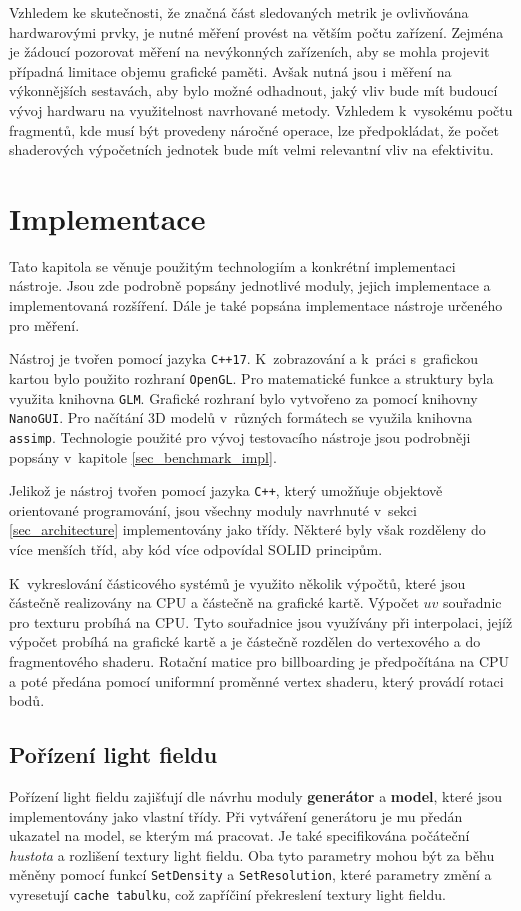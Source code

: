 Vzhledem ke skutečnosti, že značná část sledovaných metrik je ovlivňována hardwarovými prvky, je nutné měření provést na větším počtu zařízení. Zejména je žádoucí pozorovat měření na nevýkonných zařízeních, aby se mohla projevit případná limitace objemu grafické paměti. Avšak nutná jsou i měření na výkonnějších sestavách, aby bylo možné odhadnout, jaký vliv bude mít budoucí vývoj hardwaru na využitelnost navrhované metody. Vzhledem k~vysokému počtu fragmentů, kde musí být provedeny náročné operace, lze předpokládat, že počet shaderových výpočetních jednotek bude mít velmi relevantní vliv na efektivitu.

\chapter{Implementace}
Tato kapitola se věnuje použitým technologiím a konkrétní implementaci nástroje. Jsou zde podrobně popsány jednotlivé moduly, jejich implementace a implementovaná rozšíření. Dále je také popsána implementace nástroje určeného pro měření.

Nástroj je tvořen pomocí jazyka \texttt{C++17}. K~zobrazování a k~práci s~grafickou kartou bylo použito rozhraní \texttt{OpenGL}. Pro matematické funkce a struktury byla využita knihovna \texttt{GLM}. Grafické rozhraní bylo vytvořeno za pomocí knihovny \texttt{NanoGUI}. Pro načítání 3D modelů v~různých formátech se využila knihovna \texttt{assimp}. Technologie použité pro vývoj testovacího nástroje jsou podrobněji popsány v~kapitole \ref{sec_benchmark_impl}.

Jelikož je nástroj tvořen pomocí jazyka \texttt{C++}, který umožňuje objektově orientované programování, jsou všechny moduly navrhnuté v~sekci \ref{sec_architecture} implementovány jako třídy. Některé byly však rozděleny do více menších tříd, aby kód více odpovídal SOLID principům.

K~vykreslování částicového systémů je využito několik výpočtů, které jsou částečně realizovány na CPU a částečně na grafické kartě. Výpočet $uv$ souřadnic pro texturu probíhá na CPU. Tyto souřadnice jsou využívány při interpolaci, jejíž výpočet probíhá na grafické kartě a je částečně rozdělen do vertexového a do fragmentového shaderu. Rotační matice pro billboarding je předpočítána na CPU a poté předána pomocí uniformní proměnné vertex shaderu, který provádí rotaci bodů. 

\section{Pořízení light fieldu}
Pořízení light fieldu zajišťují dle návrhu moduly \textbf{generátor} a \textbf{model}, které jsou implementovány jako vlastní třídy. Při vytváření generátoru je mu předán ukazatel na model, se kterým má pracovat. Je také specifikována počáteční \emph{hustota} a rozlišení textury light fieldu. Oba tyto parametry mohou být za běhu měněny pomocí funkcí \texttt{SetDensity} a \texttt{SetResolution}, které parametry změní a vyresetují \texttt{cache tabulku}, což zapříčiní překreslení textury light fieldu. 
